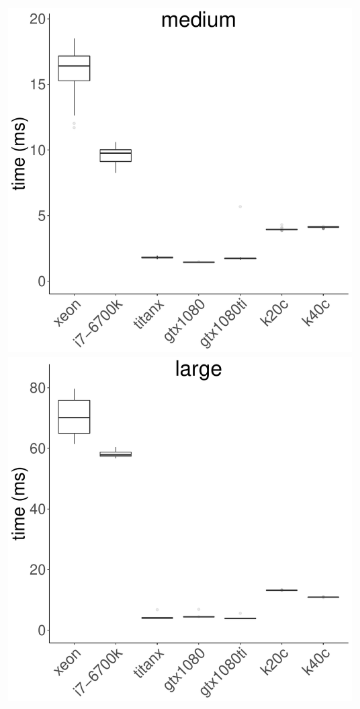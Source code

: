 \documentclass[../document.tex]{subfiles}
\begin{document}
\begin{figure}
\begin{subfigure}{0.9\textwidth}
		\includegraphics[width=\plotwidth]{figures/time-results/generate_dwt_medium_boxplot-1}
		\includegraphics[width=\plotwidth]{figures/time-results/generate_dwt_large_boxplot-1}
	\end{subfigure}


\end{figure}
\end{document}
